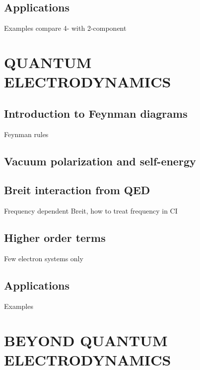 \documentclass[12pt]{article}
\begin{document}
\subsection{\sffamily Applications}
Examples compare 4- with 2-component

\section{\label{QED} \sffamily \Large QUANTUM ELECTRODYNAMICS}

\subsection{\sffamily Introduction to Feynman diagrams}
Feynman rules




\subsection{\sffamily Vacuum polarization and self-energy}


\subsection{\sffamily Breit interaction from QED}
Frequency dependent Breit, how to treat frequency in CI

\subsection{\sffamily Higher order terms}
Few electron systems only

\subsection{\sffamily Applications}
Examples


\section{\sffamily \Large BEYOND QUANTUM ELECTRODYNAMICS}
\end{document}
